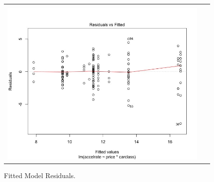 \documentclass[acmsmall]{acmart}
\begin{document}
\begin{figure}[H] %
	\centering
	\begin{tabular}{| p{}|}
	\hline
	\\
	\includegraphics[width=0.95\textwidth]{../graphics/TWAresid}\\
	\hline
	\end{tabular}	
	\caption{Fitted Model Residuals.} %
	\label{fig:TWARES}
\end{figure}
\end{document}
